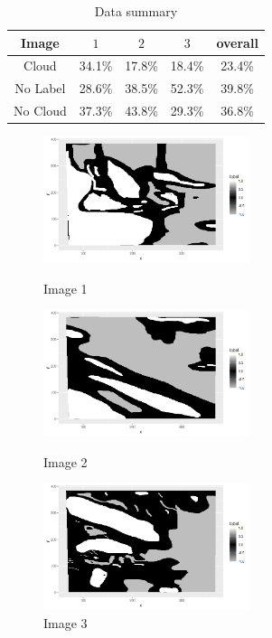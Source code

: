 \documentclass[11pt]{article}
\theoremstyle{definition}
\begin{document}
\begin{table}[h]
    \centering
  \begin{tabular}{c||c|c|c|c}
	 Image
    & $1$
    & $2$
    & $3$
    & overall \\
    \hline
    \hline
    Cloud
    & 34.1\%
    & 17.8\%
    & 18.4\% 
    & 23.4\% \\
    \hline
    No Label
    & 28.6\%
    & 38.5\%
    & 52.3\%
    & 39.8\% \\
    \hline
    No Cloud
    & 37.3\%
    & 43.8\%
    & 29.3\%
    & 36.8\%
  \end{tabular}
    \caption{Data summary}
    \label{tab1}
\end{table}
\FloatBarrier

\begin{figure}[h]
\begin{minipage}[t]{0.33\textwidth}
\centering
\includegraphics[width=6cm]{figures/1b1.png}
\caption{Image 1}
\label{1b1}
\end{minipage}
\begin{minipage}[t]{0.33\textwidth}
\centering
\includegraphics[width=6cm]{figures/1b2.png}
\caption{Image 2}
\label{1b2}
\end{minipage}
\begin{minipage}[t]{0.33\textwidth}
\centering
\includegraphics[width=6cm]{figures/1b3.png}
\caption{Image 3}
\label{1b3}
\end{minipage}
\end{figure}
\FloatBarrier 
\end{document}
